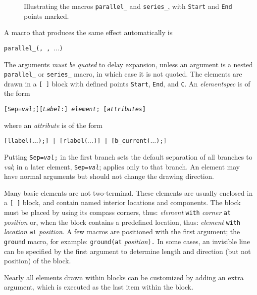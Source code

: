 \begin{figure}[ht]
   
   \vspace*{-\baselineskip}
   \caption{Illustrating the macros {\tt parallel\_} and {\tt series\_},
       with {\tt Start} and {\tt End} points marked.}
   \label{ParSeries}
   \end{figure}

A macro that produces the same effect automatically is

{\tt parallel\_({\RQ, \RQ,}
 $\ldots$)}

The arguments {\em must be quoted} to delay expansion, unless an argument
is a nested {\tt parallel\_} or {\tt series\_} macro,
in which case it is not quoted.
The elements are drawn in a {\tt [ ]} block with defined points
{\tt Start}, {\tt End}, and {\tt C}.
An {\sl elementspec} is of the form

{\tt [Sep={\sl val};][{\sl Label}:] {\sl element}; [{\sl attributes}]}

\noindent
where an {\sl attribute} is of the form

{\tt [llabel($\ldots$);] | [rlabel($\ldots$)] | [b\_current($\ldots$);]}

Putting {\tt Sep={\sl val};} in the first branch sets the default
separation of all branches to {\sl val}; in a later
element, {\tt Sep={\sl val}}; applies only to that branch.  
An element may have normal arguments but should
not change the drawing direction. 

Many basic elements are not two-terminal. These elements are usually enclosed in
a \verb|[ ]| \pic block, and contain named interior locations and components.
The block must be placed by using its compass corners, thus:
  {\sl element} {\tt with} {\sl corner} {\tt at} {\sl position} 
or, when the block contains a predefined location, thus:
  {\sl element} {\tt with} {\sl location} {\tt at} {\sl position}.
A few macros are positioned with the first argument;
the {\tt ground} macro, for example:
  {\tt ground(}{\tt at} {\sl position}{\tt ).} 
In some cases, an invisible line can be specified by the first argument
to determine length and direction (but not position) of the block.

Nearly all elements drawn within blocks can be customized by adding an
extra argument, which is executed as the last item within the block.

